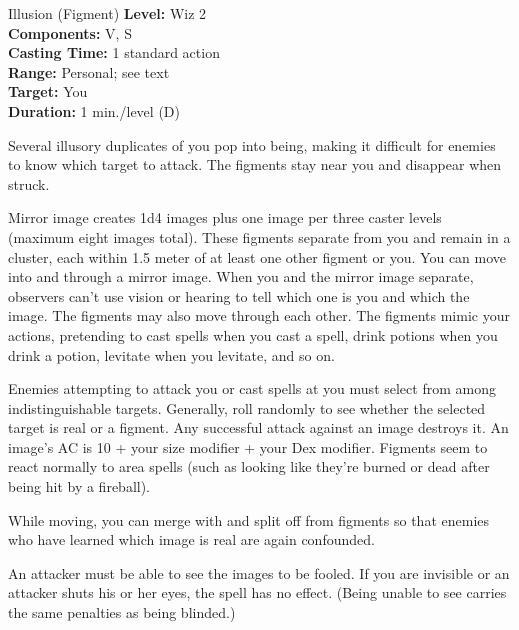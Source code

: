{Illusion (Figment)}
{
	\textbf{Level:}
	Wiz 2\\
	\textbf{Components:}
	V, S\\
	\textbf{Casting Time:}
	1 standard action\\
	\textbf{Range:}
	Personal; see text\\
	\textbf{Target:}
	You\\
	\textbf{Duration:}
	1 min./level (D)\\
}
{
	Several illusory duplicates of you pop into being, making it difficult for enemies to know which target to attack. The figments stay near you and disappear when struck.

	Mirror image creates 1d4 images plus one image per three caster levels (maximum eight images total). These figments separate from you and remain in a cluster, each within 1.5 meter of at least one other figment or you. You can move into and through a mirror image. When you and the mirror image separate, observers can't use vision or hearing to tell which one is you and which the image. The figments may also move through each other. The figments mimic your actions, pretending to cast spells when you cast a spell, drink potions when you drink a potion, levitate when you levitate, and so on.

	Enemies attempting to attack you or cast spells at you must select from among indistinguishable targets. Generally, roll randomly to see whether the selected target is real or a figment. Any successful attack against an image destroys it. An image's AC is 10 + your size modifier + your Dex modifier. Figments seem to react normally to area spells (such as looking like they're burned or dead after being hit by a fireball).

	While moving, you can merge with and split off from figments so that enemies who have learned which image is real are again confounded.

	An attacker must be able to see the images to be fooled. If you are invisible or an attacker shuts his or her eyes, the spell has no effect. (Being unable to see carries the same penalties as being blinded.)

}
